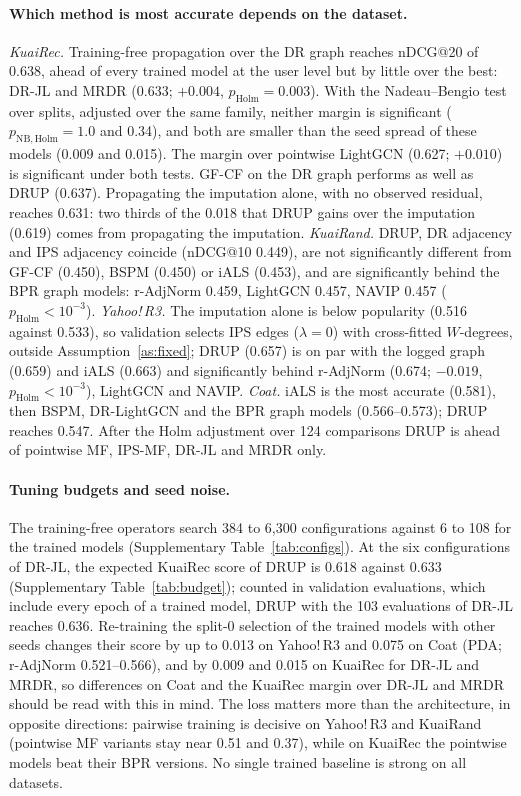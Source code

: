 \paragraph{Which method is most accurate depends on the dataset.}
\emph{KuaiRec.} Training-free propagation over the DR graph reaches nDCG@20 of 0.638,
ahead of every trained model at the user level but by little over the best: DR-JL and
MRDR (0.633; $+0.004$, $p_{\mathrm{Holm}}=0.003$). With the Nadeau--Bengio test over
splits, adjusted over the same family, neither margin is significant
($p_{\mathrm{NB,Holm}}=1.0$ and 0.34), and both are smaller than the seed spread of these
models (0.009 and 0.015). The margin over pointwise LightGCN (0.627; $+0.010$) is
significant under both tests. GF-CF on the DR graph performs as well as DRUP (0.637).
Propagating the imputation alone, with no observed residual, reaches 0.631: two thirds of
the 0.018 that DRUP gains over the imputation (0.619) comes from propagating the
imputation. \emph{KuaiRand.} DRUP, DR adjacency and IPS adjacency coincide (nDCG@10 0.449),
are not significantly different from GF-CF (0.450), BSPM (0.450) or iALS (0.453), and are
significantly behind the BPR graph models: r-AdjNorm 0.459, LightGCN 0.457, NAVIP 0.457
($p_{\mathrm{Holm}}<10^{-3}$). \emph{Yahoo!\,R3.} The imputation alone is below popularity
(0.516 against 0.533), so validation selects IPS edges ($\lambda=0$) with cross-fitted
$W$-degrees, outside Assumption~\ref{as:fixed}; DRUP (0.657) is on par with the logged
graph (0.659) and iALS (0.663) and significantly behind r-AdjNorm (0.674; $-0.019$,
$p_{\mathrm{Holm}}<10^{-3}$), LightGCN and NAVIP. \emph{Coat.} iALS is the most accurate
(0.581), then BSPM, DR-LightGCN and the BPR graph models (0.566--0.573); DRUP reaches 0.547.
After the Holm adjustment over 124 comparisons DRUP is ahead of pointwise MF, IPS-MF,
DR-JL and MRDR only.

\paragraph{Tuning budgets and seed noise.} The training-free operators search 384 to
6{,}300 configurations against 6 to 108 for the trained models (Supplementary Table~\ref{tab:configs}). At the six configurations of DR-JL, the expected KuaiRec score of
DRUP is 0.618 against 0.633 (Supplementary Table~\ref{tab:budget}); counted in validation
evaluations, which include every epoch of a trained model, DRUP with the 103 evaluations
of DR-JL reaches 0.636. Re-training the split-0 selection of the trained models with other
seeds changes their score by up to 0.013 on Yahoo!\,R3 and 0.075 on Coat (PDA; r-AdjNorm
0.521--0.566), and by 0.009 and 0.015 on KuaiRec for DR-JL and MRDR, so differences on
Coat and the KuaiRec margin over DR-JL and MRDR should be read with this in mind. The loss
matters more than the architecture, in opposite directions: pairwise training is decisive
on Yahoo!\,R3 and KuaiRand (pointwise MF variants stay near 0.51 and 0.37), while on
KuaiRec the pointwise models beat their BPR versions. No single trained baseline is strong
on all datasets.
